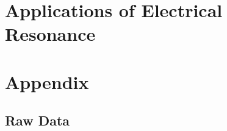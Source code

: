 \documentclass[12pt]{article}
\begin{document}
\section{Applications of Electrical Resonance}




\newpage







\newpage

\section*{Appendix}

\subsection*{Raw Data}

\listoffigures
\end{document}
